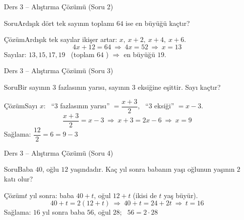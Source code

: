 \documentclass[aspectratio=169,11pt]{beamer}
\newcommand{\soru}[3]{%
\begin{frame}{#1}
  \begin{block}{Soru}\large #2\end{block}
  \pause
  \begin{exampleblock}{Çözüm}\large #3\end{exampleblock}
\end{frame}}
\begin{document}
\soru{Ders 3 -- Alıştırma Çözümü (Soru 2)}
{Ardışık dört tek sayının toplamı \(64\) ise en büyüğü kaçtır?}
{Ardışık tek sayılar ikişer artar: \(x,\ x+2,\ x+4,\ x+6\).
\[4x+12=64\ \Rightarrow\ 4x=52\ \Rightarrow\ x=13\]
Sayılar: \(13,15,17,19\) \ (toplam \(64\) \checkmark) \(\Rightarrow\) en büyüğü \(19\).}

\soru{Ders 3 -- Alıştırma Çözümü (Soru 3)}
{Bir sayının \(3\) fazlasının yarısı, sayının \(3\) eksiğine eşittir. Sayı kaçtır?}
{Sayı \(x\): \ ``\(3\) fazlasının yarısı'' \(=\dfrac{x+3}{2}\), \ ``\(3\) eksiği'' \(=x-3\).
\[\frac{x+3}{2}=x-3\ \Rightarrow\ x+3=2x-6\ \Rightarrow\ x=9\]
Sağlama: \(\dfrac{12}{2}=6=9-3\) \checkmark}

\soru{Ders 3 -- Alıştırma Çözümü (Soru 4)}
{Baba \(40\), oğlu \(12\) yaşındadır. Kaç yıl sonra babanın yaşı oğlunun yaşının \(2\) katı olur?}
{\(t\) yıl sonra: baba \(40+t\), oğul \(12+t\) (ikisi de \(t\) yaş büyür).
\[40+t=2(12+t)\ \Rightarrow\ 40+t=24+2t\ \Rightarrow\ t=16\]
Sağlama: \(16\) yıl sonra baba \(56\), oğul \(28\); \ \(56=2\cdot 28\) \checkmark}
\end{document}

